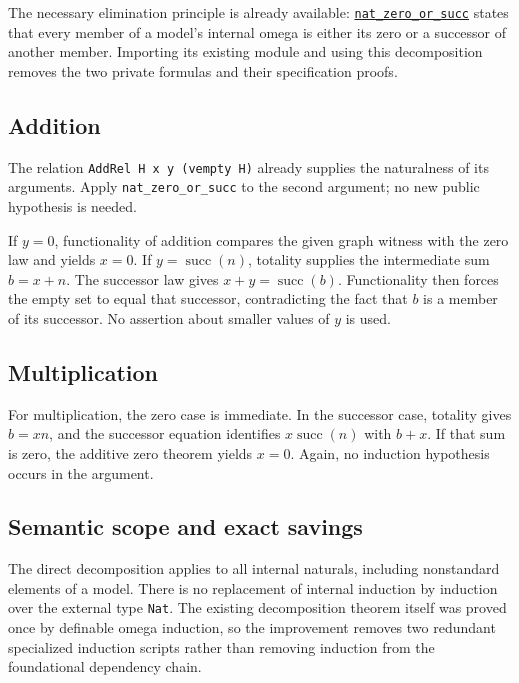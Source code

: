 \documentclass[11pt,letterpaper]{article}
\newcommand{\code}[1]{\nolinkurl{#1}}
\newcommand{\repo}[2]{\href{https://github.com/VladimirReshetnikov/ProveIt/blob/b310142330df89e48413c8fce62e7de223e1c7d5/#1}{#2}}
\begin{document}
The necessary elimination principle is already available:
\repo{SetTheory/BoundedConsistency/Lean/BoundedZFCConsistency/InternalSat.lean}{\code{nat_zero_or_succ}}
states that every member of a model's internal omega is either its zero or a
successor of another member. Importing its existing module and using this
decomposition removes the two private formulas and their specification proofs.

\subsection{Addition}

The relation \code{AddRel H x y (vempty H)} already supplies the naturalness
of its arguments. Apply \code{nat_zero_or_succ} to the second argument; no
new public hypothesis is needed.

If $y=0$, functionality of addition compares the given graph witness with the
zero law and yields $x=0$. If $y=\operatorname{succ}(n)$, totality supplies the
intermediate sum $b=x+n$. The successor law gives $x+y=\operatorname{succ}(b)$.
Functionality then forces the empty set to equal that successor, contradicting
the fact that $b$ is a member of its successor. No assertion about smaller
values of $y$ is used.


\subsection{Multiplication}

For multiplication, the zero case is immediate. In the successor case,
totality gives $b=xn$, and the successor equation identifies
$x\operatorname{succ}(n)$ with $b+x$. If that sum is zero, the additive zero
theorem yields $x=0$. Again, no induction hypothesis occurs in the argument.


\subsection{Semantic scope and exact savings}

The direct decomposition applies to all internal naturals, including
nonstandard elements of a model. There is no replacement of internal induction
by induction over the external type \code{Nat}. The existing decomposition
theorem itself was proved once by definable omega induction, so the improvement
removes two redundant specialized induction scripts rather than removing
induction from the foundational dependency chain.
\end{document}
